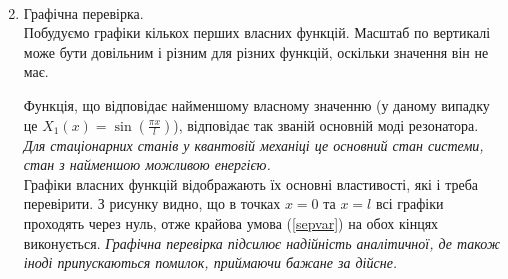 \documentclass[a4paper, 14pt]{extreport}
\begin{document}
\begin{enumerate}
\begin{enumerate}
\begin{equation*}
\begin{aligned}
\begin{aligned}
                \end{aligned}\\
            \end{aligned}
        \end{equation*}
    \end{enumerate}
    \item Графічна перевірка.\\
    Побудуємо графіки кількох перших власних функцій. Масштаб по вертикалі може бути довільним і різним для різних функцій, оскільки значення він не має.
    \begin{center}
        
    \end{center}
    Функція, що відповідає найменшому власному значенню (у даному випадку це $X_1(x) = \sin\left(\frac{\pi x}{l}\right)$), відповідає так званій основній моді резонатора. \textit{Для стаціонарних станів у квантовій механіці це основний стан системи, стан з найменшою можливою енергією.}\\
    Графіки власних функцій відображають їх основні властивості, які і треба перевірити. З рисунку видно, що в точках $x = 0$ та $x = l$ всі графіки проходять через нуль, отже крайова умова (\ref{sepvar}) на обох кінцях виконується. \textit{Графічна перевірка підсилює надійність аналітичної, де також іноді припускаються помилок, приймаючи бажане за дійсне.}
\end{enumerate}
\end{document}
